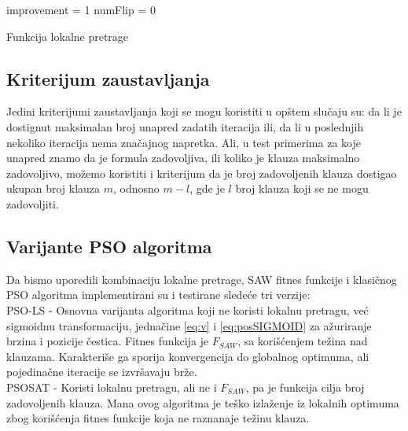 \documentclass{article}
\begin{document}
\begin{algorithm}[H]
\SetAlgoLined
{}

\BlankLine
 improvement = 1\;
 numFlip = 0\;
 \caption{Funkcija lokalne pretrage}
\end{algorithm}


\subsection{Kriterijum zaustavljanja}
Jedini kriterijumi zaustavljanja koji se mogu koristiti u opštem slučaju su: da li je dostignut maksimalan broj unapred zadatih iteracija ili, da li u poslednjih nekoliko iteracija nema značajnog napretka.
Ali, u test primerima za koje unapred znamo da je formula zadovoljiva, ili koliko je klauza maksimalno zadovoljivo, možemo koristiti i kriterijum da je broj zadovoljenih klauza dostigao ukupan broj klauza $m$, odnosno $m-l$, gde je $l$ broj klauza koji se ne mogu zadovoljiti.

\subsection{Varijante PSO algoritma}
Da bismo uporedili kombinaciju lokalne pretrage, SAW fitnes funkcije i klasičnog PSO algoritma implementirani su i testirane sledeće tri verzije: \\

PSO-LS - Osnovna varijanta algoritma koji ne koristi lokalnu pretragu, već sigmoidnu transformaciju, jednačine \ref{eq:v} i \ref{eq:posSIGMOID} za ažuriranje brzina i pozicije čestica. Fitnes funkcija je $F_{SAW}$, sa korišćenjem težina nad klauzama. Karakteriše ga sporija konvergencija do globalnog optimuma, ali pojedinačne iteracije se izvršavaju brže.\\

PSOSAT - Koristi lokalnu pretragu, ali ne i $F_{SAW}$, pa je funkcija cilja broj zadovoljenih klauza. Mana ovog algoritma je teško izlaženje iz lokalnih optimuma zbog korišćenja fitnes funkcije koja ne raznanaje težinu klauza.\\
\end{document}
